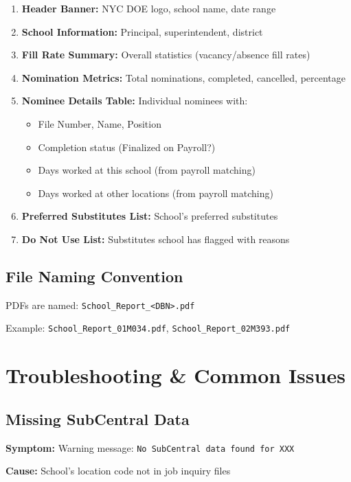 \documentclass[12pt,letterpaper]{article}
\begin{document}
\begin{enumerate}[leftmargin=*]
    \item \textbf{Header Banner:} NYC DOE logo, school name, date range
    \item \textbf{School Information:} Principal, superintendent, district
    \item \textbf{Fill Rate Summary:} Overall statistics (vacancy/absence fill rates)
    \item \textbf{Nomination Metrics:} Total nominations, completed, cancelled, percentage
    \item \textbf{Nominee Details Table:} Individual nominees with:
    \begin{itemize}
        \item File Number, Name, Position
        \item Completion status (Finalized on Payroll?)
        \item Days worked at this school (from payroll matching)
        \item Days worked at other locations (from payroll matching)
    \end{itemize}
    \item \textbf{Preferred Substitutes List:} School's preferred substitutes
    \item \textbf{Do Not Use List:} Substitutes school has flagged with reasons
\end{enumerate}

\subsection{File Naming Convention}

PDFs are named: \texttt{School\_Report\_<DBN>.pdf}

Example: \texttt{School\_Report\_01M034.pdf}, \texttt{School\_Report\_02M393.pdf}

\section{Troubleshooting \& Common Issues}

\subsection{Missing SubCentral Data}

\textbf{Symptom:} Warning message: \texttt{No SubCentral data found for XXX}

\textbf{Cause:} School's location code not in job inquiry files
\end{document}
